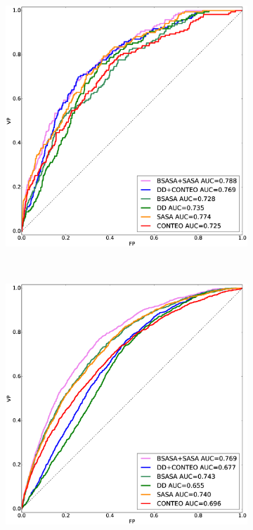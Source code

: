 \begin{figure}
  \centering  
  \begin{subfigure}{.5\linewidth}
    \centering
    \includegraphics[width=\linewidth]{figures/resultados/prot/classA.eps}
    \caption{}
  \end{subfigure}%
~
  \begin{subfigure}{.5\linewidth}
    \centering
    \includegraphics[width=\linewidth]{figures/resultados/prot/classB.eps}
    \caption{}
  \end{subfigure}
 

\end{figure}
